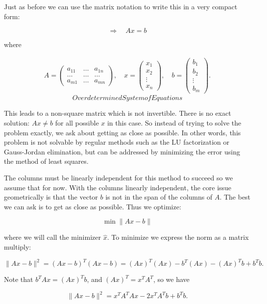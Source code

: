 Just as before we can use the matrix notation to write this in a very
compact form:

\[\Rightarrow\quad  Ax = b\]

where

\[\begin{aligned}
A = \left( \begin{array}{ccc}a_{11}&\dots&a_{1n}\\ \dots & \dots & \dots
  \\ a_{m1} & \dots & a_{mn}\end{array}\right), \quad x = \left(\begin{array}{c} x_1 \\ x_2 \\ \vdots
  \\ x_n \end{array}\right) , \quad
  b =  \left(\begin{array}{c} b_1 \\ b_2 \\ \vdots
  \\ b_m \end{array}\right) .
\end{aligned}\]\[Overdetermined System of Equations\]

This leads to a non-square matrix which is not invertible. There is no
exact solution: \(Ax \neq b\) for all possible \(x\) in this case. So
instead of trying to solve the problem exactly, we ask about getting as
close as possible. In other words, this problem is not solvable by
regular methods such as the LU factorization or Gauss-Jordan
elimination, but can be addressed by minimizing the error using the
method of least squares.

The columns must be linearly independent for this method to succeed so
we assume that for now. With the columns linearly independent, the core
issue geometrically is that the vector \(b\) is not in the span of the
columns of \(A\). The best we can ask is to get as close as possible.
Thus we optimize:

\[\min \| Ax - b\|\]

where we will call the minimizer \(\hat{x}\). To minimize we express the
norm as a matrix multiply:

\[\| Ax - b\|^2 =  (Ax - b)^T(Ax - b) =  (Ax)^T(Ax) - b^T(Ax) -  (Ax)^Tb +  b^Tb .\]

Note that \(b^TAx  =  (Ax)^Tb\), and \((Ax)^T = x^TA^T\), so we have

\[\| Ax - b\|^2 = x^TA^T Ax -2x^TA^Tb  +   b^Tb.\]


